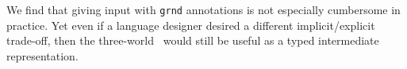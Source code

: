 \begin{abstrsyn}
We find that giving input with \texttt{grnd} annotations is not especially cumbersome in practice.
Yet even if a language designer desired a different implicit/explicit trade-off,
then the three-world \lang\ would still be useful as a typed intermediate representation.

\end{abstrsyn}



